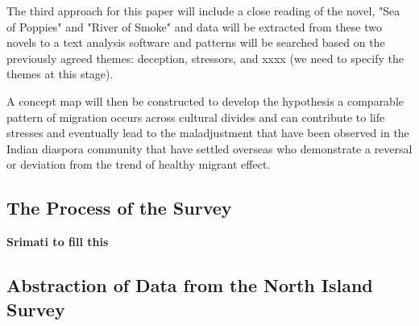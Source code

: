 The third approach for this paper will include a close reading of the novel, "Sea of Poppies" and "River of Smoke" and data will be extracted from these two novels to a text analysis software and patterns will be searched based on the previously agreed themes: deception, stressors, and xxxx (we need to specify the themes at this stage).

A concept map will then be constructed to develop the hypothesis a comparable pattern of migration occurs across cultural divides and can contribute to life stresses and eventually lead to the maladjustment that have been observed in the Indian diaspora community that have settled overseas who demonstrate a reversal or deviation from the trend of healthy migrant effect. 

\subsection{The Process of the Survey}
\textbf{Srimati to fill this}

\subsection{Abstraction of Data from the North Island Survey}


